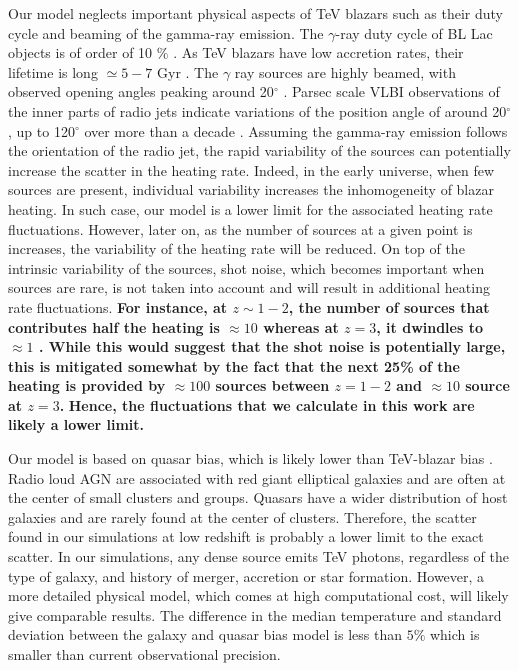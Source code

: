 \documentclass[numberedappendix]{emulateapj}
\newcommand\ALc[1]{{\color{red} \bf #1}} %
\newcommand\Pc[1]{{\color{cyan} \bf #1}} %
\begin{document}
Our model neglects important physical aspects of TeV blazars such as their duty cycle and beaming of the gamma-ray emission. The $\gamma$-ray duty cycle of BL Lac objects is of order of 10 $\%$ \citep{1996ApJ...464..600S}. As TeV blazars have low accretion rates, their lifetime is long $\simeq 5-7$ Gyr \citep{2002ApJ...571..226C}. The $\gamma$ ray sources are highly beamed, with observed opening angles peaking around 20$^{\circ}$ \citep{2009A&A...507L..33P}. Parsec scale VLBI observations of the inner parts of radio jets indicate variations of the position angle of around 20$^{\circ}$, up to 120$^{\circ}$ over more than a decade \citep{2013AJ....146..120L}. Assuming the gamma-ray emission follows the orientation of the radio jet, the rapid variability of the sources can potentially increase the scatter in the heating rate. Indeed, in the early universe, when few sources are present,  individual variability increases the inhomogeneity of blazar heating. In such case, our model is a lower limit for the associated heating rate fluctuations. However, later on, as the number of sources at a  given point is increases, the variability of the heating rate will be reduced.    On top of the intrinsic  variability  of the sources, shot noise, which becomes important when sources are rare, is not taken into account and will result in additional heating rate fluctuations. \Pc{For instance, at $z \sim 1-2$, the number of sources that contributes half the heating is $\approx 10$ whereas at $z = 3$, it dwindles to $\approx 1$ \citep{2012ApJ...752...23C}.   While this would suggest that the shot noise is potentially large, this is mitigated somewhat by the fact that the next 25\% of the heating is provided by $\approx 100$ sources between $z=1-2$ and $\approx 10$ source at $z=3$. } 
\Pc{Hence, the fluctuations that we calculate in this work are likely a lower limit.}

Our model is based on quasar bias, which is likely lower than TeV-blazar bias \citep{2014arXiv1410.0358A}. Radio loud AGN are associated with red giant elliptical galaxies \citep{2007A&A...476..723H} and are often at the center of small clusters and groups. Quasars have a wider distribution of host galaxies and are rarely found at the center of clusters. Therefore, the scatter found in our simulations at low redshift is probably a lower limit to the exact scatter. In our simulations, any dense source emits TeV photons, regardless of the type of galaxy, and history of merger, accretion or star formation. However, a more detailed physical model, which comes at high computational cost, will likely give comparable results. The difference in the median temperature and standard deviation between the galaxy and quasar bias model is less than $5\%$ which is smaller than current observational precision.
\end{document}

